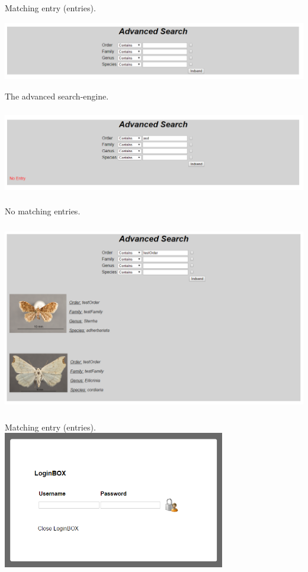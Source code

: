 \documentclass[12pt,a4paper]{article}
\begin{document}
Matching entry (entries).\\
\includegraphics[height=33mm]{Beetle5.png}\\
The advanced search-engine.\\
\includegraphics[height=45mm]{Beetle6.png}\\
No matching entries.\\
\includegraphics[height=90mm]{Beetle7.png}\\
Matching entry (entries).\\
\includegraphics[height=60mm]{Beetle8.png}\\
\end{document}
